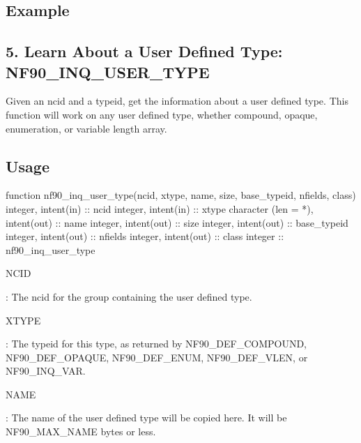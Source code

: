 \subsection*{Example}\hypertarget{f90-user-defined-data-types_f90-learn-about-a-user-defined-type-nf90_inq_user_type}{}\subsection{5. Learn About a User Defined Type\+: N\+F90\+\_\+\+I\+N\+Q\+\_\+\+U\+S\+E\+R\+\_\+\+T\+Y\+P\+E }\label{f90-user-defined-data-types_f90-learn-about-a-user-defined-type-nf90_inq_user_type}
Given an ncid and a typeid, get the information about a user defined type. This function will work on any user defined type, whether compound, opaque, enumeration, or variable length array.

\subsection*{Usage}


\begin{DoxyCode}
\textcolor{keyword}{function }nf90\_inq\_user\_type(ncid, xtype, name, size, base\_typeid, nfields, class)
  \textcolor{keywordtype}{integer}, \textcolor{keywordtype}{intent(in)} :: ncid
  \textcolor{keywordtype}{integer}, \textcolor{keywordtype}{intent(in)} :: xtype
  \textcolor{keywordtype}{character (len = *)}, \textcolor{keywordtype}{intent(out)} :: name
  \textcolor{keywordtype}{integer}, \textcolor{keywordtype}{intent(out)} :: size
  \textcolor{keywordtype}{integer}, \textcolor{keywordtype}{intent(out)} :: base\_typeid
  \textcolor{keywordtype}{integer}, \textcolor{keywordtype}{intent(out)} :: nfields
  \textcolor{keywordtype}{integer}, \textcolor{keywordtype}{intent(out)} :: class
  \textcolor{keywordtype}{integer} :: nf90\_inq\_user\_type
\end{DoxyCode}


{\ttfamily N\+C\+ID}

\+: The ncid for the group containing the user defined type.

{\ttfamily X\+T\+Y\+PE}

\+: The typeid for this type, as returned by N\+F90\+\_\+\+D\+E\+F\+\_\+\+C\+O\+M\+P\+O\+U\+ND, N\+F90\+\_\+\+D\+E\+F\+\_\+\+O\+P\+A\+Q\+UE, N\+F90\+\_\+\+D\+E\+F\+\_\+\+E\+N\+UM, N\+F90\+\_\+\+D\+E\+F\+\_\+\+V\+L\+EN, or N\+F90\+\_\+\+I\+N\+Q\+\_\+\+V\+AR.

{\ttfamily N\+A\+ME}

\+: The name of the user defined type will be copied here. It will be N\+F90\+\_\+\+M\+A\+X\+\_\+\+N\+A\+ME bytes or less.

